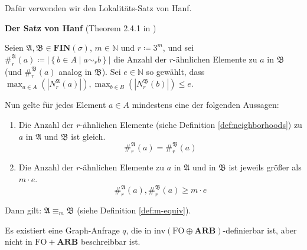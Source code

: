 Dafür verwenden wir den Lokalitäts-Satz von Hanf.

\bigskip{}

\begin{thm}
\textbf{Der Satz von Hanf} (Theorem 2.4.1 in \cite{EbbinghausFlum})

Seien $\mathfrak{A},\mathfrak{B}\in\mathbf{FIN}\left(\sigma\right)$,
$m\in\mathbb{N}$ und $r\coloneqq3^{m}$, und sei $\#_{r}^{\mathfrak{A}}\left(a\right)\coloneqq\left|\left\{ b\in A\mid a\sim_{r}b\right\} \right|$
die Anzahl der $r$-ähnlichen Elemente zu $a$ in $\mathfrak{B}$
(und $\#_{r}^{\mathfrak{B}}\left(a\right)$ analog in $\mathfrak{B}$).
Sei $e\in\mathbb{N}$ so gewählt, dass $\max_{a\in A}\left(\left|N_{r}^{\mathfrak{A}}\left(a\right)\right|\right),\max_{b\in B}\left(\left|N_{r}^{\mathfrak{B}}\left(b\right)\right|\right)\leqslant e$.

Nun gelte für jedes Element $a\in A$ mindestens eine der folgenden
Aussagen:

\begin{enumerate}
\item Die Anzahl der $r$-ähnlichen Elemente (siehe Definition \ref{def:neighborhoods})
zu $a$ in $\mathfrak{A}$ und $\mathfrak{B}$ ist gleich.
\[
\#_{r}^{\mathfrak{A}}\left(a\right)=\#_{r}^{\mathfrak{B}}\left(a\right)
\]
\item Die Anzahl der $r$-ähnlichen Elemente zu $a$ in $\mathfrak{A}$
und in $\mathfrak{B}$ ist jeweils größer als $m\cdot e$.
\[
\#_{r}^{\mathfrak{A}}\left(a\right),\#_{r}^{\mathfrak{B}}\left(a\right)\geqslant m\cdot e
\]
\end{enumerate}
Dann gilt: $\mathfrak{A}\equiv_{m}\mathfrak{B}$ (siehe Definition
\ref{def:m-equiv}).
\end{thm}
\begin{lem}
Es existiert eine Graph-Anfrage $q$, die in $\mathrm{inv}\left(\mathrm{FO}\oplus\mathbf{ARB}\right)$-definierbar
ist, aber nicht in $\mathrm{FO}+\mathbf{ARB}$ beschreibbar ist.
\end{lem}
